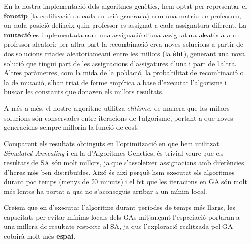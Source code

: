 \documentclass[10pt,twocolumn]{article}
\begin{document}
En la nostra implementació dels algoritmes genètics, hem optat per representar el \textbf{fenotip} (la codificació de cada solució generada) com una matriu de professors, on cada posició defineix quin professor es assignat a cada assignatura diferent. La \textbf{mutació} es implementada com una assignació d'una assignatura aleatòria a un professor aleatori; per altra part la recombinació crea noves solucions a partir de dos solucions triades aleatoriameant entre les millors (la \textbf{élit}), generant una nova solució que tingui part de les assignacions d'assigatures d'una i part de l'altra. Altres paràmetres, com la mida de la població, la probabilitat de recombinació o la de mutació, s'han triat de forme empírica a base d'executar l'algorisme i buscar les constants que donaven els millors resultats.

A més a més, el nostre algoritme utilitza \textit{elitisme}, de manera que les millors solucions són conservades entre iteracions de l'algorisme, portant a que noves generacions sempre millorin la funció de cost.

Comparant els resultats obtinguts en l'optimització en que hem utilitzat \textit{Simulated Annealing} i en la d'Algoritmes Genètics, és trivial veure que els resultats de SA són molt millors, ja que s'assoleixen assignacions amb diferències d'hores més ben distribuïdes. Aixó és així perquè hem executat els algoritmes durant poc temps (menys de 20 minuts) i el fet que les iteracions en GA són molt més lentes ha portat a que no s'aconseguís arribar a un mínim local.

Creiem que en d'executar l'algoritme durant períodes de temps més llargs, les capacitats per evitar mínims locals dels GAs mitjançant l'especiació portaran a una millora de resultats respecte al SA, ja que l'exploració realitzada pel GA cobrirà molt més \textbf{espai}.
\end{document}
